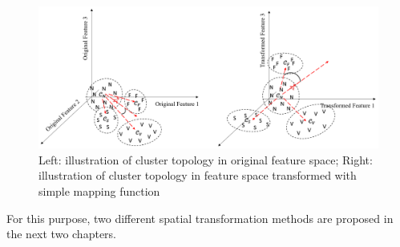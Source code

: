 \begin{figure}[thpb]
\centering
\includegraphics[scale=.5]{Fig/topo1.png}
\caption{Left: illustration of cluster topology in original feature space; Right: illustration of cluster topology in feature space transformed with simple mapping function}
\label{fig:topo1}
\end{figure}

For this purpose, two different spatial transformation methods are proposed in the next two chapters.